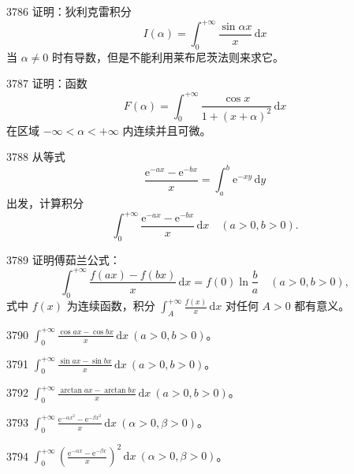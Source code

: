 \begin{prob}[M]{3786}
证明：狄利克雷积分
\[
I(\alpha) = \int_{0}^{+\infty} \frac{\sin \alpha x}{x}\,\mathrm{d}x
\]
当 $\alpha \neq 0$ 时有导数，但是不能利用莱布尼茨法则来求它。
\end{prob}

\begin{prob}[M]{3787}
证明：函数
\[
F(\alpha) = \int_{0}^{+\infty} \frac{\cos x}{1 + (x + \alpha)^2}\,\mathrm{d}x
\]
在区域 $-\infty < \alpha < +\infty$ 内连续并且可微。
\end{prob}

\begin{prob}[M]{3788}
从等式
\[
\frac{\mathrm{e}^{-ax} - \mathrm{e}^{-bx}}{x} = \int_{a}^{b} \mathrm{e}^{-xy}\,\mathrm{d}y
\]
出发，计算积分
\[
\int_{0}^{+\infty} \frac{\mathrm{e}^{-ax} - \mathrm{e}^{-bx}}{x}\,\mathrm{d}x \quad (a > 0, b > 0).
\]
\end{prob}

\begin{prob}[M]{3789}
证明傅茹兰公式：
\[
\int_{0}^{+\infty} \frac{f(ax) - f(bx)}{x}\,\mathrm{d}x = f(0) \ln \frac{b}{a} \quad (a > 0, b > 0),
\]
式中 $f(x)$ 为连续函数，积分 $\int_{A}^{+\infty} \frac{f(x)}{x}\,\mathrm{d}x$ 对任何 $A > 0$ 都有意义。
\end{prob}


\begin{prob}[S]{3790}
$\int_{0}^{+\infty} \frac{\cos ax - \cos bx}{x}\,\mathrm{d}x \ (a > 0, b > 0)$。
\end{prob}

\begin{prob}[S]{3791}
$\int_{0}^{+\infty} \frac{\sin ax - \sin bx}{x}\,\mathrm{d}x \ (a > 0, b > 0)$。
\end{prob}

\begin{prob}[S]{3792}
$\int_{0}^{+\infty} \frac{\arctan ax - \arctan bx}{x}\,\mathrm{d}x \ (a > 0, b > 0)$。
\end{prob}


\begin{prob}[S]{3793}
$\int_{0}^{+\infty} \frac{\mathrm{e}^{-\alpha x^2} - \mathrm{e}^{-\beta x^2}}{x}\,\mathrm{d}x \ (\alpha > 0, \beta > 0)$。
\end{prob}

\begin{prob}[S]{3794}
$\int_{0}^{+\infty} \left(\frac{\mathrm{e}^{-\alpha x} - \mathrm{e}^{-\beta x}}{x}\right)^2\,\mathrm{d}x \ (\alpha > 0, \beta > 0)$。
\end{prob}

